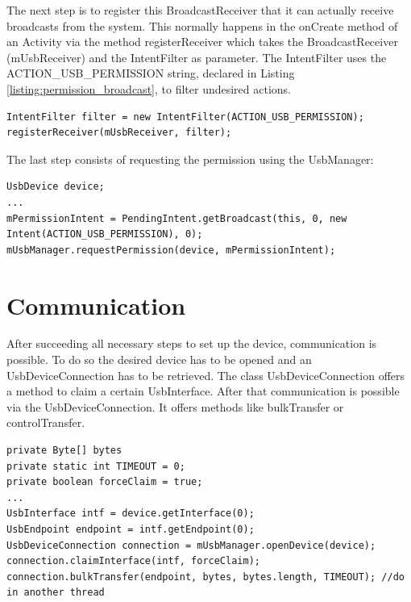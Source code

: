 The next step is to register this BroadcastReceiver that it can actually receive broadcasts from the system. This normally happens in the onCreate method of an Activity via the method registerReceiver which takes the BroadcastReceiver (mUsbReceiver) and the IntentFilter as parameter. The IntentFilter uses the ACTION\_USB\_PERMISSION string, declared in Listing \ref{listing:permission_broadcast}, to filter undesired actions.

\begin{lstlisting}[caption=Register the BroadcastReceiver \cite{android_usb_host}, label=listing:register_broadcast]
IntentFilter filter = new IntentFilter(ACTION_USB_PERMISSION);
registerReceiver(mUsbReceiver, filter);
\end{lstlisting}

The last step consists of requesting the permission using the UsbManager:

\begin{lstlisting}[caption=Request permission \cite{android_usb_host}, label=listing:request_permission]
UsbDevice device;
...
mPermissionIntent = PendingIntent.getBroadcast(this, 0, new Intent(ACTION_USB_PERMISSION), 0);
mUsbManager.requestPermission(device, mPermissionIntent);
\end{lstlisting}

\section{Communication}

After succeeding all necessary steps to set up the device, communication is possible. To do so the desired device has to be opened and an UsbDeviceConnection has to be retrieved. The class UsbDeviceConnection offers a method to claim a certain UsbInterface. After that communication is possible via the UsbDeviceConnection. It offers methods like bulkTransfer or controlTransfer.

\begin{lstlisting}[caption=Communicating with a connected device \cite{android_usb_host}, label=listing:communication]
private Byte[] bytes
private static int TIMEOUT = 0;
private boolean forceClaim = true;
...
UsbInterface intf = device.getInterface(0);
UsbEndpoint endpoint = intf.getEndpoint(0);
UsbDeviceConnection connection = mUsbManager.openDevice(device); 
connection.claimInterface(intf, forceClaim);
connection.bulkTransfer(endpoint, bytes, bytes.length, TIMEOUT); //do in another thread
\end{lstlisting}


